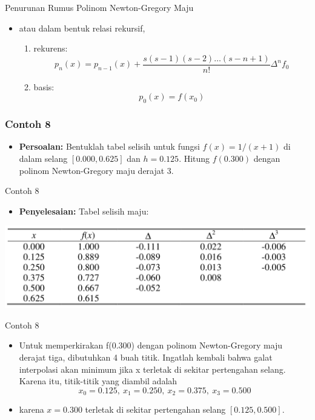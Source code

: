 \documentclass[pdflatex,compress,mathserif]{beamer}
\begin{document}
\begin{frame}{Penurunan Rumus Polinom Newton-Gregory Maju}
	\begin{itemize}
		\item atau dalam bentuk relasi rekursif,
		\begin{enumerate}
			\item rekurens:
			\[ p_n(x) = p_{n-1}(x) + \frac{s(s-1)(s-2) \dots (s-n+1)}{n!}\Delta^n f_0 \]
			\item basis:
			\[ p_0(x) = f(x_0) \]
		\end{enumerate}
	\end{itemize}
\end{frame}

\begin{frame}
	\frametitle{Contoh 8}
	\begin{itemize}
		\item \textbf{Persoalan:} Bentuklah tabel selisih untuk fungsi $ f(x) = 1/(x+1) $ di dalam selang $ [0.000, 0.625] $ dan $ h = 0.125 $. Hitung $ f(0.300) $ dengan polinom Newton-Gregory maju derajat 3.
	\end{itemize}
\end{frame}

\begin{frame}{Contoh 8}
	\begin{itemize}
		\item \textbf{Penyelesaian:} Tabel selisih maju:
	\end{itemize}
	\begin{center}
		\includegraphics[width=\linewidth]{img/img20}
	\end{center}
\end{frame}

\begin{frame}{Contoh 8}
	\begin{itemize}
		\item Untuk memperkirakan f(0.300) dengan polinom Newton-Gregory maju derajat tiga, dibutuhkan 4 buah titik. Ingatlah kembali bahwa galat interpolasi akan minimum jika x terletak di sekitar pertengahan selang. Karena itu, titik-titik yang diambil adalah
		\[ x_0 = 0.125,~ x_1 = 0.250,~ x_2 = 0.375,~ x_3 = 0.500 \]
		\item karena $ x = 0.300 $ terletak di sekitar pertengahan selang $ [0.125, 0.500] $.
	\end{itemize}
\end{frame}
\end{document}
